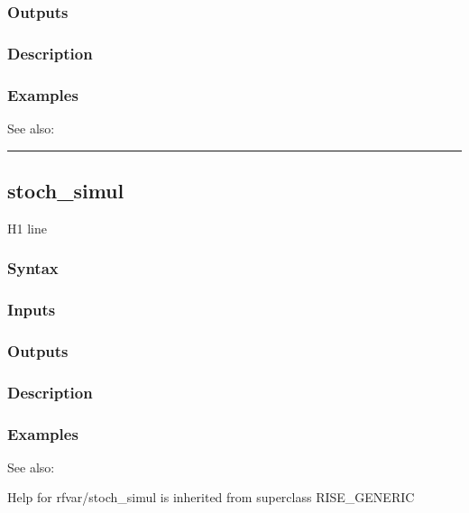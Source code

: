 \documentclass[letterpaper,10pt,english]{sphinxmanual}
\begin{document}
\subsubsection{Outputs}
\label{classes/models/@rfvar/rfvar:id136}

\subsubsection{Description}
\label{classes/models/@rfvar/rfvar:id137}

\subsubsection{Examples}
\label{classes/models/@rfvar/rfvar:id138}
See also:


\bigskip\hrule{}\bigskip



\subsection{stoch\_simul}
\label{classes/models/@rfvar/rfvar:id139}\label{classes/models/@rfvar/rfvar:stoch-simul}
H1 line


\subsubsection{Syntax}
\label{classes/models/@rfvar/rfvar:id140}

\subsubsection{Inputs}
\label{classes/models/@rfvar/rfvar:id141}

\subsubsection{Outputs}
\label{classes/models/@rfvar/rfvar:id142}

\subsubsection{Description}
\label{classes/models/@rfvar/rfvar:id143}

\subsubsection{Examples}
\label{classes/models/@rfvar/rfvar:id144}
See also:

Help for rfvar/stoch\_simul is inherited from superclass RISE\_GENERIC
\end{document}
